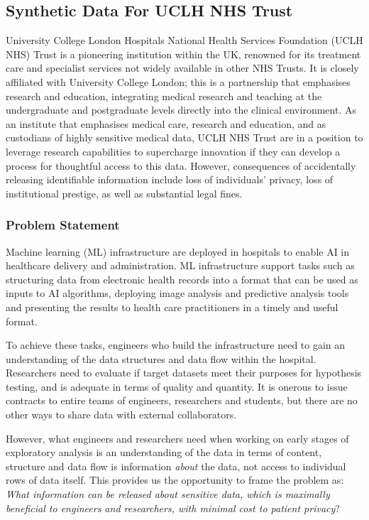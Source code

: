 \documentclass[11pt]{article}
\begin{document}
\subsection{Synthetic Data For UCLH NHS Trust}

University College London Hospitals National Health Services Foundation (UCLH NHS) Trust  is a pioneering institution within the UK, renowned for its treatment care and specialist services not widely available in other NHS Trusts. It is closely affiliated with University College London; this is a partnership that emphasises research and education, integrating medical research and teaching at the undergraduate and postgraduate levels directly into the clinical environment. 
As an institute that emphasises medical care, research and education, and as custodians of highly sensitive medical data, UCLH NHS Trust are in a position to leverage research capabilities to supercharge innovation if they can develop a process for thoughtful access to this data. 
However, consequences of accidentally releasing identifiable information include loss of individuals' privacy, loss of institutional prestige, as well as substantial legal fines.

\subsubsection{Problem Statement}

Machine learning (ML) infrastructure are deployed in hospitals to enable AI in healthcare delivery and administration. ML infrastructure support tasks such as structuring data from electronic health records into a format that can be used as inputs to AI algorithms, deploying image analysis and predictive analysis tools and presenting the results to health care practitioners in a timely and useful format.

To achieve these tasks, engineers who build the infrastructure need to gain an understanding of the data structures and data flow within the hospital. Researchers need to evaluate if target datasets meet their purposes for hypothesis testing, and is adequate in terms of quality and quantity. It is onerous to issue contracts to entire teams of engineers, researchers and students, but there are no other ways to share data with external collaborators. 

However, what engineers and researchers need when working on early stages of exploratory analysis is an understanding of the data in terms of content, structure and data flow is information \emph{about} the data, not access to individual rows of data itself. This provides us the opportunity to frame the problem as: \emph{What information can be released about sensitive data, which is maximally beneficial to engineers and researchers, with minimal cost to patient privacy}?
\end{document}
